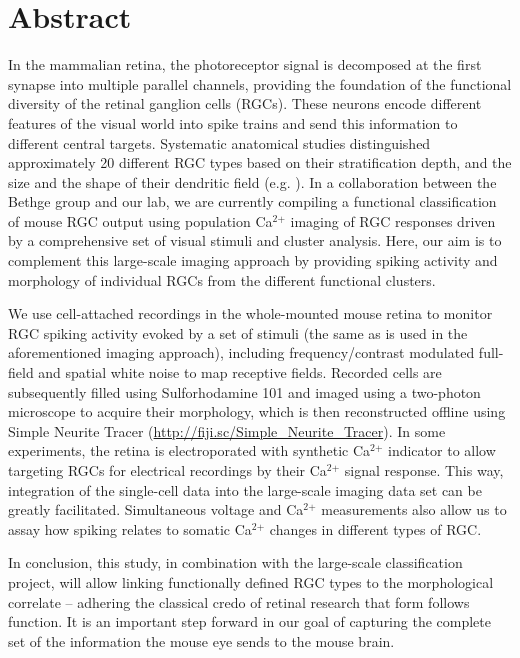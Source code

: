 \chapter{Abstract}

In the mammalian retina, the photoreceptor signal is decomposed at the first synapse into multiple parallel channels, providing the foundation of the functional diversity of the retinal ganglion cells (RGCs). These neurons encode different features of the visual world into spike trains and send this information to different central targets. Systematic anatomical studies distinguished approximately 20 different RGC types based on their stratification depth, and the size and the shape of their dendritic field (e.g. \citealp{voelgyi09, kong05}). In a collaboration between the Bethge group and our lab, we are currently compiling a functional classification of mouse RGC output using population Ca$^{\text{2+}}$ imaging of RGC responses driven by a comprehensive set of visual stimuli and cluster analysis. Here, our aim is to complement this large-scale imaging approach by providing spiking activity and morphology of individual RGCs from the different functional clusters. 

We use cell-attached recordings in the whole-mounted mouse retina to monitor RGC spiking activity evoked by a set of stimuli (the same as is used in the aforementioned imaging approach), including frequency/contrast modulated full-field and spatial white noise to map receptive fields. Recorded cells are subsequently filled using Sulforhodamine 101 and imaged using a two-photon microscope to acquire their morphology, which is then reconstructed offline using Simple Neurite Tracer (\url{http://fiji.sc/Simple_Neurite_Tracer}). In some experiments, the retina is electroporated with synthetic Ca$^{\text{2+}}$  indicator \citep{briggman11} to allow targeting RGCs for electrical recordings by their Ca$^{\text{2+}}$  signal response. This way, integration of the single-cell data into the large-scale imaging data set can be greatly facilitated. Simultaneous voltage and Ca$^{\text{2+}}$  measurements also allow us to assay how spiking relates to somatic Ca$^{\text{2+}}$  changes in different types of RGC. 

In conclusion, this study, in combination with the large-scale classification project, will allow linking functionally defined RGC types to the morphological correlate – adhering the classical credo of retinal research that form follows function. It is an important step forward in our goal of capturing the complete set of the information the mouse eye sends to the mouse brain.  
 

